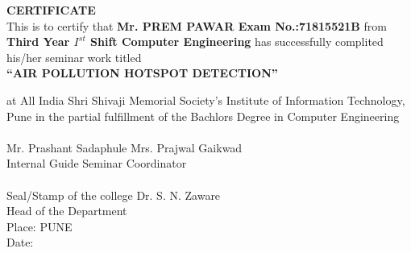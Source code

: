 \documentclass[12pt]{report}	%
\begin{document}
\begin{titlepage}
		\begin{center}
		\vspace{0.2in}
		{\large\textbf{CERTIFICATE}}\\
		\vspace{0.2in}
		{\small This is to certify that {\bf Mr. PREM PAWAR Exam No.:71815521B } from {\bf Third Year $I^{st}$ Shift Computer Engineering }
		has successfully complited his/her seminar work titled }\\
		\vspace{0.2in}
		{\large \bf {``AIR POLLUTION HOTSPOT DETECTION''}}\\
		\end{center}
		at All India Shri Shivaji Memorial Society's Institute of Information Technology, Pune 
		in the partial fulfillment of the Bachlors Degree in Computer Engineering \\
		\vspace*{0.3in}\\
		\hspace*{0.4in}Mr. Prashant Sadaphule \hspace*{1.6in} Mrs. Prajwal Gaikwad\\
		\hspace*{0.4in}Internal Guide \hspace*{2.4 in} Seminar Coordinator\\
		\vspace*{0.3in}\\
		\hspace*{0.4in}Seal/Stamp of the college \hspace*{2 in} Dr. S. N. Zaware \\
		\hspace*{0.6in}   \hspace{3.5 in} Head of the Department \\
		\hspace*{0.4in}Place: PUNE \hspace*{2.8 in}{Computer Engineering}\\
		\hspace*{0.4in}Date:
	\end{titlepage}
\end{document}
